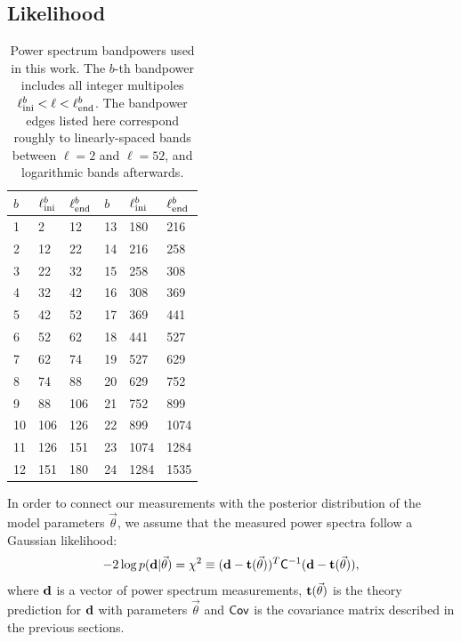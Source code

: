 \documentclass[useAMS,usenatbib]{mn2e}
\begin{document}
  \subsection{Likelihood}\label{ssec:methods.like}
    \begin{table}
      \begin{center}
        \begin{tabular}{lll|lll}
          $b$ & $\ell^b_{\rm ini}$ & $\ell^b_{\rm end}$ & $b$ & $\ell^b_{\rm ini}$ & $\ell^b_{\rm end}$ \\[1ex]
          \hline
           1 &   2 &  12 &  13 &  180 &  216\\
           2 &  12 &  22 &  14 &  216 &  258\\
           3 &  22 &  32 &  15 &  258 &  308\\
           4 &  32 &  42 &  16 &  308 &  369\\
           5 &  42 &  52 &  17 &  369 &  441\\
           6 &  52 &  62 &  18 &  441 &  527\\
           7 &  62 &  74 &  19 &  527 &  629\\
           8 &  74 &  88 &  20 &  629 &  752\\
           9 &  88 & 106 &  21 &  752 &  899\\
          10 & 106 & 126 &  22 &  899 & 1074\\
          11 & 126 & 151 &  23 & 1074 & 1284\\
          12 & 151 & 180 &  24 & 1284 & 1535\\
          \hline
        \end{tabular}
        \caption{Power spectrum bandpowers used in this work. The $b$-th bandpower includes all integer multipoles $\ell^b_{\rm ini}<\ell<\ell^b_{\rm end}$. The bandpower edges listed here correspond roughly to linearly-spaced bands between $\ell=2$ and $\ell=52$, and logarithmic bands afterwards.}\label{tab:bpws}
      \end{center}
    \end{table} 
    In order to connect our measurements with the posterior distribution of the model parameters $\vec{\theta}$, we assume that the measured power spectra follow a Gaussian likelihood:
    \begin{equation}
      -2\log p({\bf d}|\vec{\theta}) = \chi^2\equiv ({\bf d}-{\bf t}(\vec{\theta}))^T {\sf C}^{-1} ({\bf d}-{\bf t}(\vec{\theta})),
    \end{equation}
    where ${\bf d}$ is a vector of power spectrum measurements, ${\bf t}(\vec{\theta})$ is the theory prediction for ${\bf d}$ with parameters $\vec{\theta}$ and ${\sf Cov}$ is the covariance matrix described in the previous sections.
\end{document}
